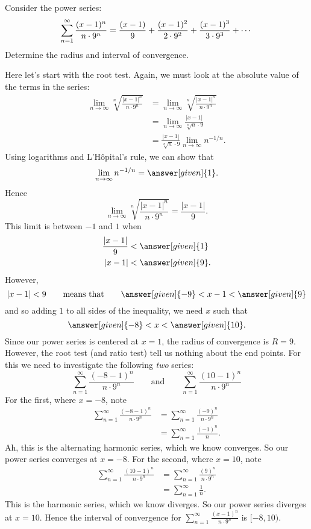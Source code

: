 \documentclass{ximera}
\begin{document}
\begin{example}
  Consider the power series:
  \[
  \sum_{n=1}^\infty \frac{(x-1)^n}{n \cdot 9^n} = \frac{(x-1)}{9} + \frac{(x-1)^2}{2\cdot 9^2} + \frac{(x-1)^3}{3\cdot 9^3} + \cdots\\
  \]
  Determine the radius and interval of convergence.
  \begin{explanation}
    Here let's start with the root test. Again, we must look at the absolute value of the terms in the series:
    \begin{align*}
      \lim_{n\to\infty}\sqrt[n]{\frac{|x-1|^n}{n \cdot 9^n}} &= \lim_{n\to\infty}\sqrt[n]{\frac{|x-1|^n}{n \cdot 9^n}}\\
      &= \lim_{n\to\infty} \frac{|x-1|}{\sqrt[n]{n} \cdot 9}\\
      &= \frac{|x-1|}{\sqrt[n]{n} \cdot 9} \lim_{n\to\infty} n^{-1/n}.
    \end{align*}
    Using logarithms and L'H\^opital's rule, we can show that
    \[
    \lim_{n\to\infty} n^{-1/n} = \answer[given]{1}.
    \]
    Hence
    \[
    \lim_{n\to\infty}\sqrt[n]{\frac{|x-1|^n}{n \cdot 9^n}} = \frac{|x-1|}{9}.
    \]
    This limit is between $-1$ and $1$ when
    \begin{align*}
    \frac{|x-1|}{9} &<\answer[given]{1}\\
    |x-1| &< \answer[given]{9}.
    \end{align*}
    However,
    \[
    |x-1| < 9 \qquad\text{means that}\qquad \answer[given]{-9} < x-1 < \answer[given]{9}
    \]
    and so adding $1$ to all sides of the inequality, we need $x$ such that
    \[
    \answer[given]{-8} < x < \answer[given]{10}.
    \]
    Since our power series is centered at $x=1$, the radius of
    convergence is $R=9$. However, the root test (and ratio test) tell
    us nothing about the end points. For this we need to investigate
    the following \textit{two} series:
    \[
    \sum_{n=1}^\infty \frac{(-8-1)^n}{n \cdot 9^n}\qquad\text{and}\qquad \sum_{n=1}^\infty \frac{(10-1)^n}{n \cdot 9^n}
    \]
    For the first, where $x=-8$, note
    \begin{align*}
      \sum_{n=1}^\infty \frac{(-8-1)^n}{n \cdot 9^n} &= \sum_{n=1}^\infty \frac{(-9)^n}{n \cdot 9^n}\\
      &= \sum_{n=1}^\infty \frac{(-1)^n}{n}.
    \end{align*}
    Ah, this is the alternating harmonic series, which we know converges. So our power series converges at $x= -8$.
    For the second, where $x=10$, note
    \begin{align*}
      \sum_{n=1}^\infty \frac{(10-1)^n}{n \cdot 9^n} &= \sum_{n=1}^\infty \frac{(9)^n}{n \cdot 9^n}\\
      &= \sum_{n=1}^\infty \frac{1}{n}.
    \end{align*}
    This is the harmonic series, which we know diverges. So our
    power series diverges at $x= 10$. Hence the interval of
    convergence for $\sum_{n=1}^\infty \frac{(x-1)^n}{n \cdot 9^n}$ is
    $[-8,10)$.
  \end{explanation}
\end{example}
\end{document}

